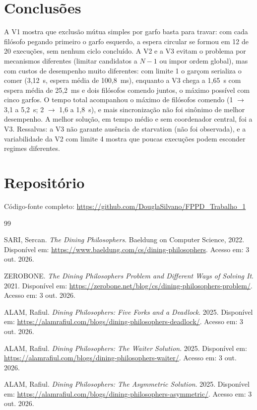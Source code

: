 \documentclass[12pt,brazil,a4paper]{article}
\begin{document}
\section{Conclusões}
A V1 mostra que exclusão mútua simples por garfo basta para travar: com cada filósofo pegando primeiro o garfo esquerdo, a espera circular se formou em 12 de 20 execuções, sem nenhum ciclo concluído. A V2 e a V3 evitam o problema por mecanismos diferentes (limitar candidatos a $N-1$ ou impor ordem global), mas com custos de desempenho muito diferentes: com limite 1 o garçom serializa o comer (3,12~s, espera média de 100,8~ms), enquanto a V3 chega a 1,65~s com espera média de 25,2~ms e dois filósofos comendo juntos, o máximo possível com cinco garfos. O tempo total acompanhou o máximo de filósofos comendo (1 $\rightarrow$ 3,1 a 5,2~s; 2 $\rightarrow$ 1,6 a 1,8~s), e mais sincronização não foi sinônimo de melhor desempenho. A melhor solução, em tempo médio e sem coordenador central, foi a V3. Ressalvas: a V3 não garante ausência de starvation (não foi observada), e a variabilidade da V2 com limite 4 mostra que poucas execuções podem esconder regimes diferentes.

\section*{Repositório}
Código-fonte completo: \url{https://github.com/DouglaSilvano/FPPD_Trabalho_1}

% 
\begin{thebibliography}{99}

SARI, Sercan.
\textit{The Dining Philosophers}.
Baeldung on Computer Science, 2022.
Disponível em: \url{https://www.baeldung.com/cs/dining-philosophers}.
Acesso em: 3 out. 2026.

ZEROBONE.
\textit{The Dining Philosophers Problem and Different Ways of Solving It}.
2021.
Disponível em: \url{https://zerobone.net/blog/cs/dining-philosophers-problem/}.
Acesso em: 3 out. 2026.

ALAM, Rafiul.
\textit{Dining Philosophers: Five Forks and a Deadlock}.
2025.
Disponível em: \url{https://alamrafiul.com/blogs/dining-philosophers-deadlock/}.
Acesso em: 3 out. 2026.

ALAM, Rafiul.
\textit{Dining Philosophers: The Waiter Solution}.
2025.
Disponível em: \url{https://alamrafiul.com/blogs/dining-philosophers-waiter/}.
Acesso em: 3 out. 2026.

ALAM, Rafiul.
\textit{Dining Philosophers: The Asymmetric Solution}.
2025.
Disponível em: \url{https://alamrafiul.com/blogs/dining-philosophers-asymmetric/}.
Acesso em: 3 out. 2026.

\end{thebibliography}
\end{document}
